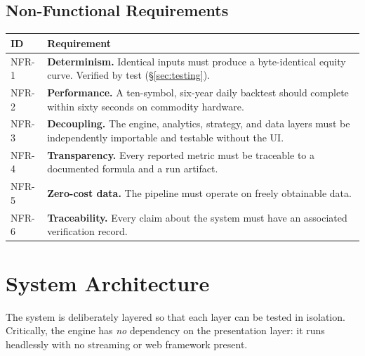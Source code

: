 \documentclass[12pt,a4paper,oneside]{report}
\begin{document}
\subsection{Non-Functional Requirements}

\begin{center}
\begin{longtable}{@{}p{1.4cm}p{11.5cm}@{}}
\toprule
\textbf{ID} & \textbf{Requirement} \\
\midrule
\endfirsthead
NFR-1 & \textbf{Determinism.} Identical inputs must produce a byte-identical equity curve. Verified by test (\S\ref{sec:testing}). \\
NFR-2 & \textbf{Performance.} A ten-symbol, six-year daily backtest should complete within sixty seconds on commodity hardware. \\
NFR-3 & \textbf{Decoupling.} The engine, analytics, strategy, and data layers must be independently importable and testable without the UI. \\
NFR-4 & \textbf{Transparency.} Every reported metric must be traceable to a documented formula and a run artifact. \\
NFR-5 & \textbf{Zero-cost data.} The pipeline must operate on freely obtainable data. \\
NFR-6 & \textbf{Traceability.} Every claim about the system must have an associated verification record. \\
\bottomrule
\end{longtable}
\end{center}

\section{System Architecture}

The system is deliberately layered so that each layer can be tested in isolation.
Critically, the engine has \emph{no} dependency on the presentation layer: it runs
headlessly with no streaming or web framework present.
\end{document}
